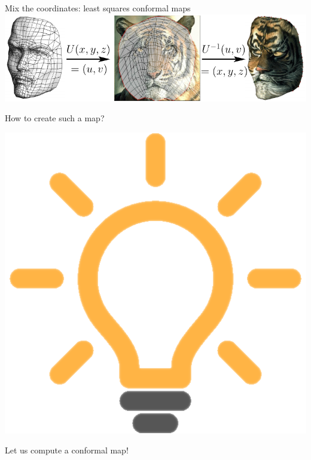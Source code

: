 \documentclass[UKenglish,aspectratio=169]{beamer}
\begin{document}
\begin{frame}{Mix the coordinates: least squares conformal maps}
\includegraphics[width=\linewidth]{../manuscript/img/tex-mapping.pdf}
\pause
\begin{center}
How to create such a map?
\pause

\includegraphics[width=.1\linewidth]{../manuscript/img/idea.png}

Let us compute a conformal map!
\end{center}
\end{frame}
\end{document}
